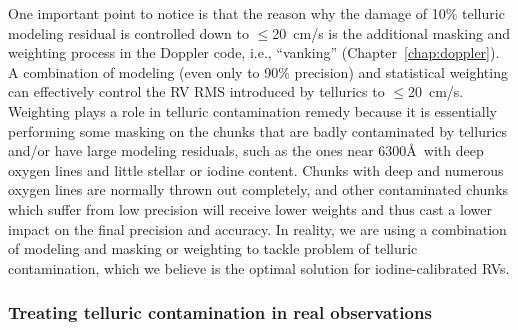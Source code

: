 One important point to notice is that the reason why the damage of
10\% telluric modeling residual is controlled down to $\leq$20~cm/s is
the additional masking and weighting process in the Doppler code,
i.e., ``vanking'' (Chapter~\ref{chap:doppler}). A
combination of modeling (even only to 90\% precision) and statistical
weighting can effectively control the RV RMS introduced by tellurics
to $\leq$20~cm/s. Weighting plays a role in telluric contamination
remedy because it is essentially performing some masking on the
chunks that are badly contaminated by tellurics and/or have large
modeling residuals, such as the ones near 6300\AA\ with deep oxygen
lines and little stellar or iodine content. Chunks with deep and
numerous oxygen lines are normally thrown out completely, and other
contaminated chunks which suffer from low precision will receive lower
weights and thus cast a lower impact on the final precision and
accuracy. In reality, we are using a combination of modeling and
masking or weighting to tackle problem of telluric contamination,
which we believe is the optimal solution for iodine-calibrated RVs.


\subsubsection{Treating telluric contamination in real observations}\label{keck:telluric:real}

